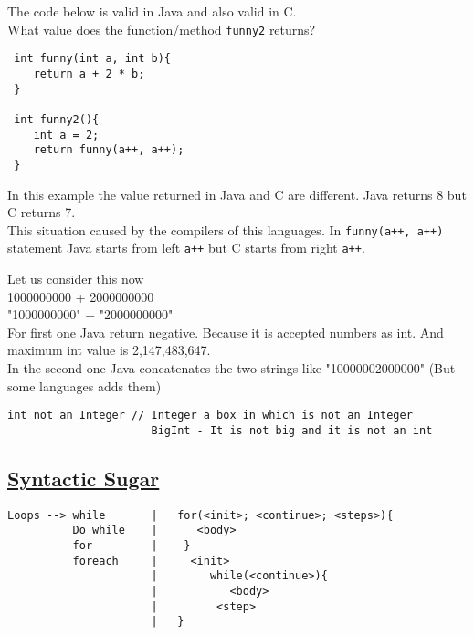 \documentclass{article}
\begin{document}
\begin{flushleft}
\begin{flushleft}
The code below is valid in Java and also valid in C. \\
What value does the function/method \verb|funny2| returns?

\begin{verbatim}
 int funny(int a, int b){
    return a + 2 * b;
 }
 
 int funny2(){
    int a = 2;
    return funny(a++, a++);
 }
\end{verbatim}

In this example the value returned in Java and C are different. Java returns 8 but C returns 7.\\
This situation caused by the compilers of this languages. In \verb|funny(a++, a++)| statement Java starts from left \verb|a++| but C starts from right \verb|a++|.\linebreak

Let us consider this now\\
1000000000 + 2000000000\\
"1000000000" + "2000000000"\\
\bigskip
For first one Java return negative. Because it is accepted numbers as int. And maximum int value is 2,147,483,647.\\
In the second one Java concatenates the two strings like "10000002000000" (But some languages adds them)\\
\vspace*{0.5cm}
\begin{verbatim}
int not an Integer // Integer a box in which is not an Integer
                      BigInt - It is not big and it is not an int
\end{verbatim}
\pagebreak
\subsection*{\underline{Syntactic Sugar}}
\begin{flushleft}
\begin{verbatim}
Loops --> while       |   for(<init>; <continue>; <steps>){
          Do while    |      <body>
          for         |    }
          foreach     |     <init>
                      |        while(<continue>){
                      |           <body>
                      |         <step>
                      |   }


\end{verbatim}
\end{flushleft}
\end{flushleft}
\end{flushleft}
\end{document}
